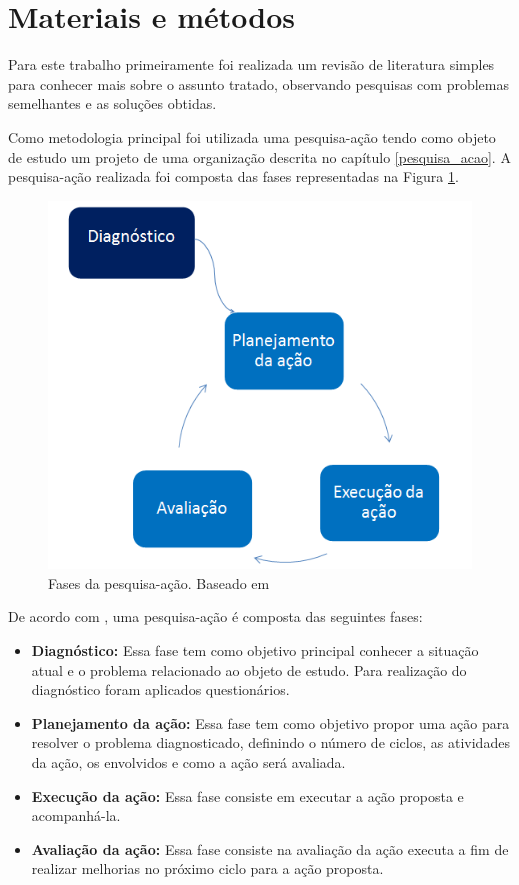 \section{Materiais e métodos}

Para este trabalho primeiramente foi realizada um revisão de literatura simples
para conhecer mais sobre o assunto tratado, observando pesquisas com problemas semelhantes e 
as soluções obtidas. 

Como metodologia principal foi utilizada uma pesquisa-ação tendo como objeto de estudo um projeto de uma organização descrita no capítulo \ref{pesquisa_acao}. A pesquisa-ação realizada foi composta das fases representadas na Figura \ref{fig:metodologia}.

	
\begin{figure}[!htb]
\centering
\includegraphics[scale=1]{figuras/pesquisaacao.png}
\caption{Fases da pesquisa-ação. Baseado em \cite{artigo_pesquisa_acao}}
\label{fig:metodologia}
\end{figure}

\pagebreak

De acordo com , uma pesquisa-ação é composta das seguintes fases: 
	\begin{itemize}
		\item \textbf{Diagnóstico:} Essa fase tem como objetivo principal conhecer a situação atual e o problema relacionado ao objeto de estudo. Para realização do diagnóstico foram aplicados questionários. 
		\item \textbf{Planejamento da ação:} Essa fase tem como objetivo propor uma ação para resolver o problema diagnosticado, definindo o número de ciclos, as atividades da ação, os envolvidos e como a ação será avaliada.
		\item \textbf{Execução da ação:} Essa fase consiste em executar a ação proposta e acompanhá-la.
		\item \textbf{Avaliação da ação:} Essa fase consiste na avaliação da ação executa a fim de realizar melhorias no próximo ciclo para a ação proposta.
	\end{itemize}

